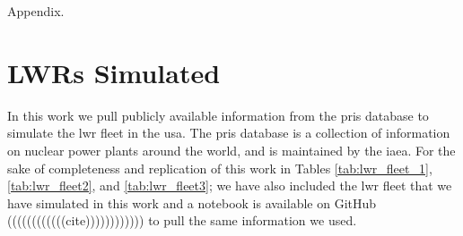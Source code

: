 Appendix.

\section{LWRs Simulated}
\label{app:lwrs}

In this work we pull publicly available information from the \gls{pris} database to simulate the \gls{lwr} fleet in the \gls{usa}. The \gls{pris} database is a collection of information on nuclear power plants around the world, and is maintained by the \gls{iaea}. For the sake of completeness and replication of this work in Tables \ref{tab:lwr_fleet_1}, \ref{tab:lwr_fleet2}, and \ref{tab:lwr_fleet3}; we have also included the \gls{lwr} fleet that we have simulated in this work and a notebook is available on GitHub ((((((((((((cite)))))))))))) to pull the same information we used.


